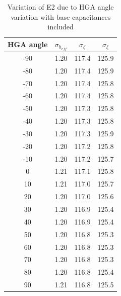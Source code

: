 \documentclass[a4paper,14pt]{extbook}
\begin{document}
\newpage
\begin{table}
\centering
\caption{Variation of E2 due to HGA angle variation with base capacitances included}\label{tab_e12var}
\begin{tabular}{|c|c|c|c|}
  \hline
HGA angle & $\sigma_{h_{eff}}$ & $\sigma_{\zeta}$ & $\sigma_{\xi}$ \\
\hline
-90 & 1.20 & 117.4 & 125.9 \\
-80 & 1.20 & 117.4 & 125.9 \\
-70 & 1.20 & 117.4 & 125.8 \\
-60 & 1.20 & 117.4 & 125.8 \\
-50 & 1.20 & 117.3 & 125.8 \\
-40 & 1.20 & 117.3 & 125.8 \\
-30 & 1.20 & 117.3 & 125.9 \\
-20 & 1.20 & 117.2 & 125.8 \\
-10 & 1.20 & 117.2 & 125.7 \\
0 & 1.21 & 117.1 & 125.8 \\
10 & 1.21 & 117.0 & 125.7 \\
20 & 1.20 & 117.0 & 125.6 \\
30 & 1.20 & 116.9 & 125.4 \\
40 & 1.20 & 116.9 & 125.4 \\
50 & 1.20 & 116.8 & 125.3 \\
60 & 1.20 & 116.8 & 125.3 \\
70 & 1.20 & 116.8 & 125.3 \\
80 & 1.20 & 116.8 & 125.4 \\
90 & 1.21 & 116.8 & 125.5 \\
\hline\end{tabular}
\end{table}
\end{document}
